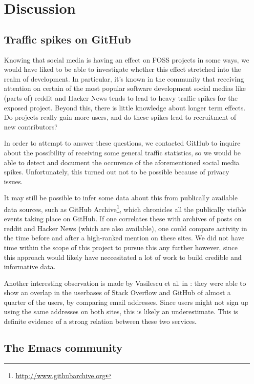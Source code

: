 \documentclass[a4paper,11pt]{article} %
\begin{document}
\section{Discussion}

\subsection{Traffic spikes on GitHub}

Knowing that social media is having an effect on FOSS projects in some ways,
we would have liked to be able to investigate whether this effect stretched
into the realm of development. In particular, it's known in the community
that receiving attention on certain of the most popular software development
social medias like (parts of) reddit and Hacker News tends to lead to heavy
traffic spikes for the exposed project. Beyond this, there is little
knowledge about longer term effects. Do projects really gain more users, and
do these spikes lead to recruitment of new contributors?

In order to attempt to answer these questions, we contacted GitHub to
inquire about the possibility of receiving some general traffic statistics,
so we would be able to detect and document the occurence of the
aforementioned social media spikes. Unfortunately, this turned out not to be
possible because of privacy issues.

It may still be possible to infer some data about this from publically
available data sources, such as GitHub
Archive\footnote{\url{http://www.githubarchive.org}}, which chronicles all
the publically visible events taking place on GitHub. If one correlates
these with archives of posts on reddit and Hacker News (which are also
available), one could compare activity in the time before and after a
high-ranked mention on these sites. We did not have time within the scope of
this project to pursue this any further however, since this approach would
likely have neccesitated a lot of work to build credible and informative
data.

Another interesting observation is made by Vasilescu et al. in
\cite{Vasilescu2013Overlap}: they were able to show an overlap in the
userbases of Stack Overflow and GitHub of almost a quarter of the
users, by comparing email addresses. Since users might not sign up
using the same addresses on both sites, this is likely an
underestimate. This is definite evidence of a strong relation between
these two services.

\subsection{The Emacs community}
\end{document}
